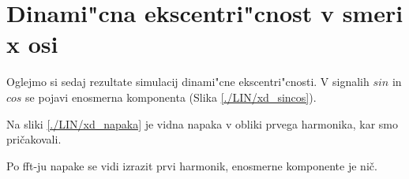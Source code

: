 %
%
%
\section{Dinami"cna ekscentri"cnost v smeri x osi}
%
Oglejmo si sedaj rezultate simulacij dinami"cne ekscentri"cnosti. V signalih $sin$ in $cos$ se pojavi enosmerna komponenta (Slika \ref{./LIN/xd_sincos}).

 Na sliki \ref{./LIN/xd_napaka} je vidna napaka v obliki prvega harmonika, kar smo pričakovali.

Po fft-ju napake se vidi izrazit prvi harmonik, enosmerne komponente je nič.


\newpage
